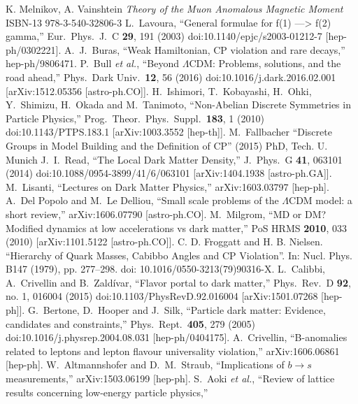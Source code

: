 \begin{thebibliography}{xxx}
K. Melnikov, A. Vainshtein \textit{Theory of the Muon Anomalous Magnetic Moment} ISBN-13 978-3-540-32806-3
  L.~Lavoura,
  ``General formulae for f(1) ---> f(2) gamma,''
  Eur.\ Phys.\ J.\ C {\bf 29}, 191 (2003)
  doi:10.1140/epjc/s2003-01212-7
  [hep-ph/0302221]. 
  A.~J.~Buras,
  ``Weak Hamiltonian, CP violation and rare decays,''
  hep-ph/9806471.
  P.~Bull {\it et al.},
  ``Beyond $\Lambda$CDM: Problems, solutions, and the road ahead,''
  Phys.\ Dark Univ.\  {\bf 12}, 56 (2016)
  doi:10.1016/j.dark.2016.02.001
  [arXiv:1512.05356 [astro-ph.CO]].
    H.~Ishimori, T.~Kobayashi, H.~Ohki, Y.~Shimizu, H.~Okada and M.~Tanimoto,
  ``Non-Abelian Discrete Symmetries in Particle Physics,''
  Prog.\ Theor.\ Phys.\ Suppl.\  {\bf 183}, 1 (2010)
  doi:10.1143/PTPS.183.1
  [arXiv:1003.3552 [hep-th]].
   M.~Fallbacher ``Discrete Groups in Model Building and the Definition of CP'' (2015) PhD, Tech. U. Munich
  J.~I.~Read,
  ``The Local Dark Matter Density,''
  J.\ Phys.\ G {\bf 41}, 063101 (2014)
  doi:10.1088/0954-3899/41/6/063101
  [arXiv:1404.1938 [astro-ph.GA]].
  M.~Lisanti,
  ``Lectures on Dark Matter Physics,''
  arXiv:1603.03797 [hep-ph].
  A.~Del Popolo and M.~Le Delliou,
  ``Small scale problems of the $\Lambda$CDM model: a short review,''
  arXiv:1606.07790 [astro-ph.CO].
  M.~Milgrom,
  ``MD or DM? Modified dynamics at low accelerations vs dark matter,''
  PoS HRMS {\bf 2010}, 033 (2010)
  [arXiv:1101.5122 [astro-ph.CO]].
  C. D. Froggatt and H. B. Nielsen.
“Hierarchy of Quark Masses, Cabibbo Angles and CP Violation”.
In: Nucl. Phys. B147 (1979), pp. 277–298.
doi: 10.1016/0550-3213(79)90316-X.
  L.~Calibbi, A.~Crivellin and B.~Zaldívar,
  ``Flavor portal to dark matter,''
  Phys.\ Rev.\ D {\bf 92}, no. 1, 016004 (2015)
  doi:10.1103/PhysRevD.92.016004
  [arXiv:1501.07268 [hep-ph]].
  G.~Bertone, D.~Hooper and J.~Silk,
  ``Particle dark matter: Evidence, candidates and constraints,''
  Phys.\ Rept.\  {\bf 405}, 279 (2005)
  doi:10.1016/j.physrep.2004.08.031
  [hep-ph/0404175].
  A.~Crivellin,
  ``B-anomalies related to leptons and lepton flavour universality violation,''
  arXiv:1606.06861 [hep-ph].
  W.~Altmannshofer and D.~M.~Straub,
  ``Implications of $b\to s$ measurements,''
  arXiv:1503.06199 [hep-ph].
  S.~Aoki {\it et al.},
  ``Review of lattice results concerning low-energy particle physics,''

\end{thebibliography}
